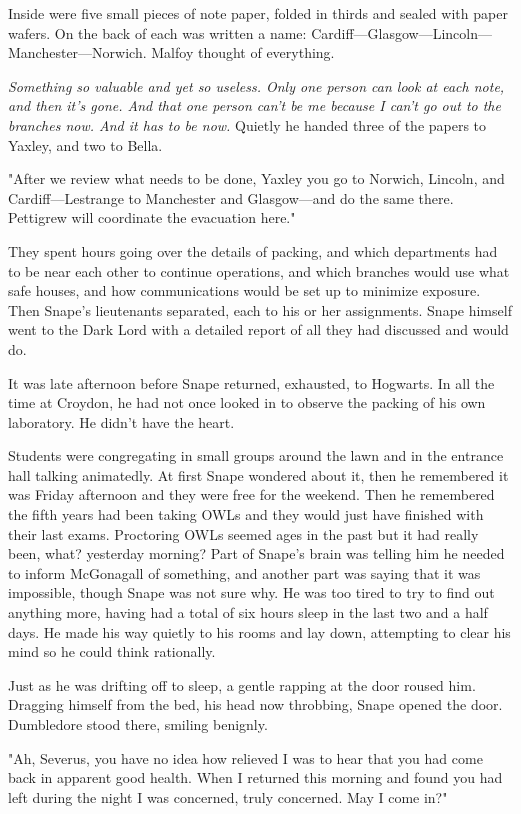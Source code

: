 Inside were five small pieces of note paper, folded in thirds and sealed with paper wafers. On the back of each was written a name: Cardiff—Glasgow—Lincoln—Manchester—Norwich. Malfoy thought of everything.

\emph{Something so valuable and yet so useless. Only one person can look at each note, and then it's gone. And that one person can't be me because I can't go out to the branches now. And it has to be now.} Quietly he handed three of the papers to Yaxley, and two to Bella.

"After we review what needs to be done, Yaxley you go to Norwich, Lincoln, and Cardiff—Lestrange to Manchester and Glasgow—and do the same there. Pettigrew will coordinate the evacuation here."

They spent hours going over the details of packing, and which departments had to be near each other to continue operations, and which branches would use what safe houses, and how communications would be set up to minimize exposure. Then Snape's lieutenants separated, each to his or her assignments. Snape himself went to the Dark Lord with a detailed report of all they had discussed and would do.

It was late afternoon before Snape returned, exhausted, to Hogwarts. In all the time at Croydon, he had not once looked in to observe the packing of his own laboratory. He didn't have the heart.

Students were congregating in small groups around the lawn and in the entrance hall talking animatedly. At first Snape wondered about it, then he remembered it was Friday afternoon and they were free for the weekend. Then he remembered the fifth years had been taking OWLs and they would just have finished with their last exams. Proctoring OWLs seemed ages in the past but it had really been, what? yesterday morning? Part of Snape's brain was telling him he needed to inform McGonagall of something, and another part was saying that it was impossible, though Snape was not sure why. He was too tired to try to find out anything more, having had a total of six hours sleep in the last two and a half days. He made his way quietly to his rooms and lay down, attempting to clear his mind so he could think rationally.

Just as he was drifting off to sleep, a gentle rapping at the door roused him. Dragging himself from the bed, his head now throbbing, Snape opened the door. Dumbledore stood there, smiling benignly.

"Ah, Severus, you have no idea how relieved I was to hear that you had come back in apparent good health. When I returned this morning and found you had left during the night I was concerned, truly concerned. May I come in?"

